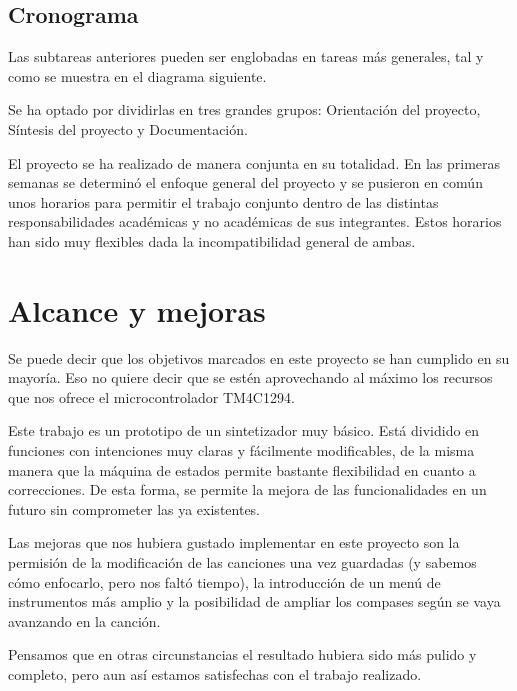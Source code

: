 \documentclass[12pt,a4paper]{article}
\begin{document}
\subsection{Cronograma}
Las subtareas anteriores pueden ser englobadas en tareas más generales, tal y como se muestra en el diagrama siguiente.

Se ha optado por dividirlas en tres grandes grupos: Orientación del proyecto, Síntesis del proyecto y Documentación.

El proyecto se ha realizado de manera conjunta en su totalidad. En las primeras semanas se determinó el enfoque general del proyecto y se pusieron en común unos horarios para permitir el trabajo conjunto dentro de las distintas responsabilidades académicas y no académicas de sus integrantes. Estos horarios han sido muy flexibles dada la incompatibilidad general de ambas.





\newpage
\section{Alcance y mejoras}
Se puede decir que los objetivos marcados en este proyecto se han cumplido en su mayoría. Eso no quiere decir que se estén aprovechando al máximo los recursos que nos ofrece el microcontrolador TM4C1294. 

Este trabajo es un prototipo de un sintetizador muy básico. Está dividido en funciones con intenciones muy claras y fácilmente modificables, de la misma manera que la máquina de estados permite bastante flexibilidad en cuanto a correcciones. De esta forma, se permite la mejora de las funcionalidades en un futuro sin comprometer las ya existentes.

Las mejoras que nos hubiera gustado implementar en este proyecto son la permisión de la modificación de las canciones una vez guardadas (y sabemos cómo enfocarlo, pero nos faltó tiempo), la introducción de un menú de instrumentos más amplio y la posibilidad de ampliar los compases según se vaya avanzando en la canción.

Pensamos que en otras circunstancias el resultado hubiera sido más pulido y completo, pero aun así estamos satisfechas con el trabajo realizado.
\end{document}
